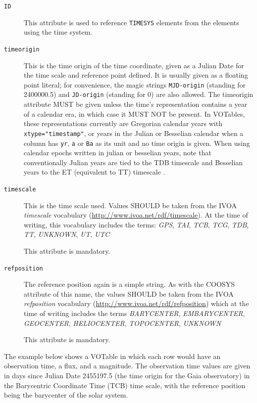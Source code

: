 \documentclass[11pt,a4paper]{ivoa}
\let\fg=\color
\def\attr#1{{\tt{\fg{DarkRed}#1}}}
\def\elem#1{{\tt{\fg{DarkRed}#1}}}
\def\attrval#1#2{{\tt{\fg{DarkRed}#1}="{\fg{DarkPurple}#2}"}}
\begin{document}
\begin{description}
\item[\attr{ID}] This attribute is used to reference \elem{TIMESYS}
elements from the elements using the time system.
\item[\attr{timeorigin}] This is the time origin of the time coordinate,
given as a Julian Date for the  time scale and reference point
defined.  It is usually given as a floating point
literal; for convenience, the magic strings \verb|MJD-origin| (standing
for 2400000.5) and \verb|JD-origin| (standing for 0) are also allowed.
The timeorigin attribute MUST be given unless the time's representation
contains a year of a calendar era, in which case it MUST NOT be present.
In VOTables, these
representations currently are Gregorian calendar years with
\attrval{xtype}{timestamp}, or years in the Julian or Besselian calendar when a column
has \verb|yr|, \verb|a| or \verb|Ba| as its unit and no time origin is
given.
When using calendar epochs written in julian or besselian years, note that
conventionally Julian years are tied to the TDB timescale and Besselian years to
the ET (equivalent to TT) timescale \citep{2015A+A...574A..36R}.

\item[\attr{timescale}]  This is the time scale used.  Values SHOULD be
taken from the IVOA \emph{timescale} vocabulary (\url{http://www.ivoa.net/rdf/timescale}).
At the time of writing, this vocabulary includes the terms:
\textsl{GPS},
\textsl{TAI},
\textsl{TCB},
\textsl{TCG},
\textsl{TDB},
\textsl{TT},
\textsl{UNKNOWN},
\textsl{UT},
\textsl{UTC}

This attribute is mandatory.
\item[\attr{refposition}] The reference position again is a simple string.
As with the COOSYS attribute of this name, the values SHOULD be
taken from the IVOA \emph{refposition} vocabulary
(\url{http://www.ivoa.net/rdf/refposition}) which at the time of writing
includes the terms
\textsl{BARYCENTER},
\textsl{EMBARYCENTER},
\textsl{GEOCENTER},
\textsl{HELIOCENTER},
\textsl{TOPOCENTER},
\textsl{UNKNOWN}

This attribute is mandatory.
\end{description}

The example below shows a VOTable in which each row would have an observation
time, a flux, and a magnitude.  The observation time values are given in days since
Julian Date 2455197.5 (the time origin for the Gaia observatory) in the Barycentric
Coordinate Time (TCB) time scale, with the reference position being the barycenter
of the solar system.
\end{document}
